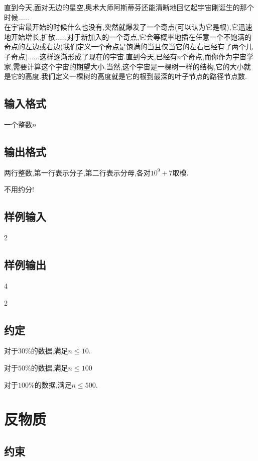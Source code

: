 \documentclass[]{article}
\begin{document}
直到今天,面对无边的星空,奥术大师阿斯蒂芬还能清晰地回忆起宇宙刚诞生的那个时候......\\

在宇宙最开始的时候什么也没有,突然就爆发了一个奇点(可以认为它是根),它迅速地开始增长,扩散......对于新加入的一个奇点,它会等概率地插在任意一个不饱满的奇点的左边或右边(我们定义一个奇点是饱满的当且仅当它的左右已经有了两个儿子奇点)......这样逐渐形成了现在的宇宙.直到今天,已经有$n$个奇点,而你作为宇宙学家,需要计算这个宇宙的期望大小.当然,这个宇宙是一棵树一样的结构,它的大小就是它的高度.我们定义一棵树的高度就是它的根到最深的叶子节点的路径节点数.

\subsection{输入格式}

一个整数$n$

\subsection{输出格式}

两行整数,第一行表示分子,第二行表示分母,各对$10^{9}+7$取模.

不用约分!

\subsection{样例输入}
2
\subsection{样例输出}
4

2
\subsection{约定}

对于$30\%$的数据,满足$n \le 10$.

对于$50\%$的数据,满足$n \le 100$

对于$100\%$的数据,满足$n \le 500$.

\newpage

\section{反物质}

\subsection{约束}
\end{document}
